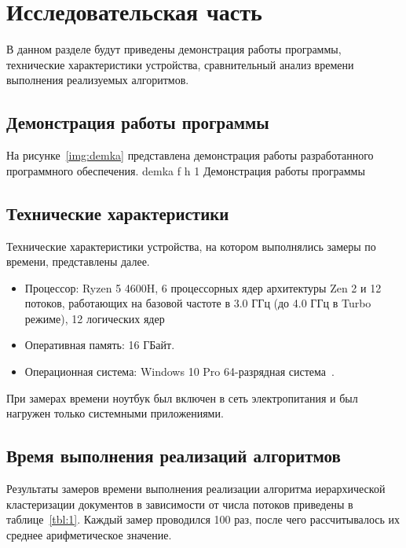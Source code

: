 \chapter{Исследовательская часть}

В данном разделе будут приведены демонстрация работы программы, технические характеристики устройства, сравнительный анализ времени выполнения реализуемых алгоритмов.

\section{Демонстрация работы программы}

На рисунке~\ref{img:demka} представлена демонстрация работы разработанного программного обеспечения.
{demka} %
{f} %
{h} %
{1\textwidth} %
{Демонстрация работы программы} %
\fi
\section{Технические характеристики}

Технические характеристики устройства, на котором выполнялись замеры по времени, представлены далее.

\begin{itemize}
	\item Процессор: Ryzen 5 4600H, 6 процессорных ядер архитектуры Zen 2 и 12 потоков, работающих на базовой частоте в 3.0 ГГц (до 4.0 ГГц в Turbo режиме), 12 логических ядер~\cite{ryzen}
	\item Оперативная память: 16 ГБайт.
	\item Операционная система: Windows 10 Pro 64-разрядная система~\cite{windows}.
\end{itemize}

При замерах времени ноутбук был включен в сеть электропитания и был нагружен только системными приложениями.


\section{Время выполнения реализаций алгоритмов}

Результаты замеров времени выполнения реализации алгоритма иерархической кластеризации документов в зависимости от числа потоков приведены в таблице~\ref{tbl:1}.
Каждый замер проводился 100 раз, после чего рассчитывалось их среднее арифметическое значение.

